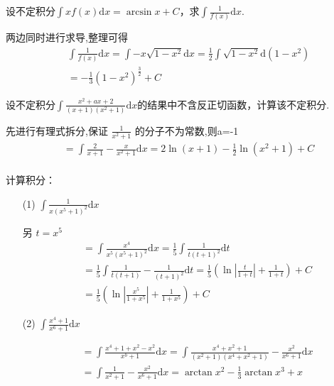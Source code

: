 \begin{xiti}
\begin{solution}
		\end{solution}
	\item 设不定积分$\int x f ( x ) \mathrm { d } x = \arcsin x + C$，求$\int \frac { 1 } { f ( x ) } \mathrm { d } x$.
	\begin{solution}
		两边同时进行求导,整理可得\\
		\begin{align*}
			& \int \frac{1}{f(x)} \mathrm{d} x =\int -x\sqrt{1-x^2} \mathrm{d}x =\frac{1}{2} \int \sqrt{1-x^2} \mathrm{d} (1-x^2) \\
			&=- \frac{1}{3} (1-x^2)^{\frac{3}{2}} + C
		\end{align*}
	\end{solution}
	\item 设不定积分$\int \frac { x ^ { 2 } + a x + 2 } { ( x + 1 ) \left( x ^ { 2 } + 1 \right) }\mathrm{d}x$的结果中不含反正切函数，计算该不定积分.
	\begin{solution}
		先进行有理式拆分,保证 $\frac{1}{x^2+1}$ 的分子不为常数,则a=-1
		\begin{align*}
			&= \int \frac{2}{x+1} -\frac{x}{x^2+1} \mathrm{d}x= 2 \ln (x+1)-\frac{1}{2} \ln \left(x^{2}+1\right)+C \\
		\end{align*}
	\end{solution}	
	\item 计算积分：
	\begin{enumerate}
		\item[(1)] $\int \frac { 1 } { x \left( x ^ { 5 } + 1 \right) ^ { 2 } }\mathrm{d}x$
		\begin{solution}
			另 $t=x^5$
		\begin{align*}
			&=\int \frac{x^4}{x^5(x^5+1)^2} \mathrm{d}x =  \frac{1}{5} \int \frac{1}{t(t+1)^2} \mathrm{ d}t\\
			&=\frac{1}{5} \int \frac{1}{t(t+1)}-\frac{1}{(t+1)^2} \mathrm{d}t = \frac{1}{5} ( \ln |\frac{t}{1+t}| +\frac{1}{1+t}) + C  \\
			&=\frac{1}{5} ( \ln |\frac{x^5}{1+x^5}| +\frac{1}{1+x^5}) + C
		\end{align*}
		\end{solution}

		\item[(2)]  $\int \frac { x ^ { 4 } + 1 } { x ^ { 6 } + 1 }\mathrm{d}x$
		\begin{solution}
		\begin{align*}
		&=\int \frac{x^{4}+1+x^{2}-x^{2}}{x^{b}+1} \mathrm{ d}x= \int \frac{x^4+x^2+1}{(x^2+1)(x^4+x^2+1)}-\frac{x^2}{x^6+1} \mathrm{ d}x \\
		&=\int \frac{1}{x^{2}+1}-\frac{x^{2}}{x^{6}+1} \mathrm{d} x =\arctan x^{2}-\frac{1}{3} \arctan x^{3}+x	
		\end{align*}
		\end{solution}	
		

\end{enumerate}
\end{xiti}
